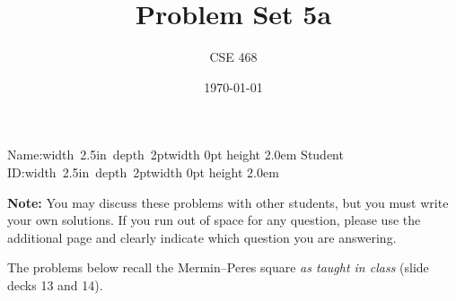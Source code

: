 \documentclass[12pt]{article}
\title{Problem Set 5a}
\author{CSE 468}
\date{\today}
\newcommand{\NameBlank}{\mbox{\hskip 4pt\vrule width 2.5in depth 2pt}\vrule width 0pt height 2.0em}
\begin{document}
\maketitle

\noindent Name:\NameBlank{} \newline
\noindent Student ID:\NameBlank{} \newline

\textbf{Note:} You may discuss these problems with other students, but you must write your own solutions. If you run out of space for any question, please use the additional page and clearly indicate which question you are answering.

\bigskip

The problems below recall the Mermin--Peres square \emph{as taught in class} (slide decks 13 and 14).
\end{document}
